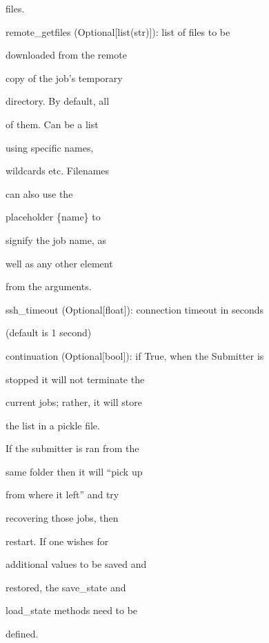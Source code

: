 \documentclass[letterpaper,10pt,english]{sphinxmanual}
\begin{document}
\begin{fulllineitems}
\begin{DUlineblock}{0em}
\begin{DUlineblock}{\DUlineblockindent}
\begin{DUlineblock}{\DUlineblockindent}
\item[] files.
\end{DUlineblock}
\item[] remote\_getfiles (Optional{[}list(str){]}): list of files to be
\item[]
\begin{DUlineblock}{\DUlineblockindent}
\item[] downloaded from the remote
\item[] copy of the job's temporary
\item[] directory. By default, all
\item[] of them. Can be a list
\item[] using specific names,
\item[] wildcards etc. Filenames
\item[] can also use the
\item[] placeholder \{name\} to
\item[] signify the job name, as
\item[] well as any other element
\item[] from the arguments.
\end{DUlineblock}
\item[] ssh\_timeout (Optional{[}float{]}): connection timeout in seconds
\item[]
\begin{DUlineblock}{\DUlineblockindent}
\item[] (default is 1 second)
\end{DUlineblock}
\item[] continuation (Optional{[}bool{]}): if True, when the Submitter is
\item[]
\begin{DUlineblock}{\DUlineblockindent}
\item[] stopped it will not terminate the
\item[] current jobs; rather, it will store
\item[] the list in a pickle file.
\item[] If the submitter is ran from the
\item[] same folder then it will ``pick up
\item[] from where it left'' and try
\item[] recovering those jobs, then
\item[] restart. If one wishes for
\item[] additional values to be saved and
\item[] restored, the save\_state and
\item[] load\_state methods need to be
\item[] defined.
\end{DUlineblock}
\end{DUlineblock}
\end{DUlineblock}


\end{fulllineitems}
\end{document}
